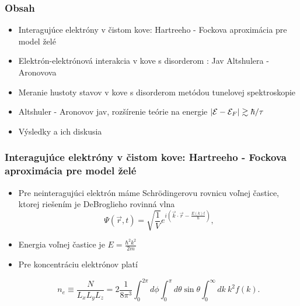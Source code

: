 \documentclass[
	11pt, %
]{beamer}
\begin{document}
\begin{frame}
	\frametitle{Obsah} %
	\begin{itemize}
	\item Interagujúce elektróny v čistom kove: Hartreeho - Fockova aproximácia pre model želé
	\item Elektrón-elektrónová interakcia v kove s disorderom : Jav Altshulera - Aronovova
	\item Meranie hustoty stavov v kove s disorderom metódou tunelovej spektroskopie
	\item Altshuler - Aronovov jav, rozšírenie teórie na energie $|\mathcal{E} - \mathcal{E}_F| \gtrsim \hbar/\tau$
	\item Výsledky a ich diskusia
	\end{itemize}
\end{frame}
\begin{frame}


\frametitle{Interagujúce elektróny v čistom kove: Hartreeho - Fockova aproximácia pre model želé}
\begin{itemize}
\item Pre neinteragujúci elektrón máme Schr\"odingerovu rovnicu voľnej častice,
ktorej riešením je DeBroglieho rovinná vlna
\begin{equation}
\label{eq:fp}
 \Psi(\vec r,t)=\sqrt{\frac{1}{V}}e^{i(\vec k\cdot\vec r-\frac{E(k)t}{\hbar})} \text{,}
\end{equation}
\item Energia voľnej častice je $E=\frac{\hbar^2k^2}{2m}$
\item Pre koncentráciu  elektrónov platí

\begin{equation}
 \label{eq:N integral sfercky}
 n_e \equiv \frac{N}{L_xL_yL_z} = 2 \frac{1}{8\pi^3} \int_0^{2\pi} d\phi \int_0^{\pi}  d\theta \sin{\theta} \int_0^{\infty} dk\ k^2 f(k)  \text{.}
\end{equation}
\end{itemize}
\end{frame}
\end{document}
